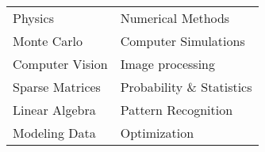 \begin{tabular}{ l l}
Physics             & Numerical Methods         \\
Monte Carlo         & Computer Simulations     \\ 
Computer Vision     & Image processing          \\
Sparse Matrices     & Probability \& Statistics \\
Linear Algebra      & Pattern Recognition      \\   
Modeling Data       & Optimization              \\
\end{tabular}
